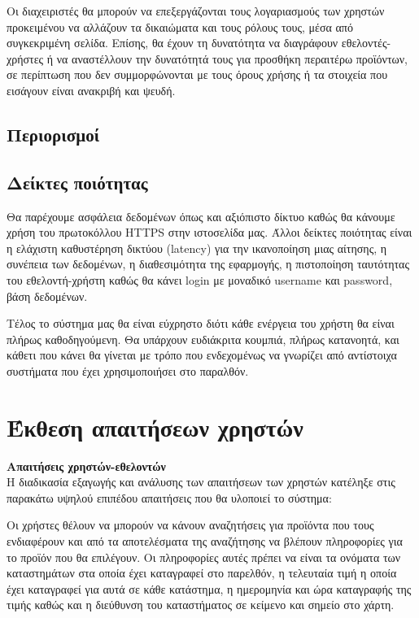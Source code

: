 \documentclass[12pt, oneside, a4paper]{report}
\begin{document}
\hspace{0.6cm}Οι διαχειριστές θα μπορούν να επεξεργάζονται τους λογαριασμούς των χρηστών προκειμένου να αλλάζουν τα δικαιώματα και τους ρόλους τους, μέσα από συγκεκριμένη σελίδα. Επίσης, θα έχουν τη δυνατότητα να διαγράφουν εθελοντές-χρήστες ή να αναστέλλουν την δυνατότητά τους για προσθήκη περαιτέρω προϊόντων, σε περίπτωση που δεν συμμορφώνονται με τους όρους χρήσης ή τα στοιχεία που εισάγουν είναι ανακριβή και ψευδή.

\subsection{Περιορισμοί}

\subsection{Δείκτες ποιότητας}
\hspace{0.6cm}Θα παρέχουμε ασφάλεια δεδομένων όπως και αξιόπιστο δίκτυο καθώς θα κάνουμε χρήση του πρωτοκόλλου HTTPS στην ιστοσελίδα μας. Άλλοι δείκτες ποιότητας είναι η ελάχιστη καθυστέρηση δικτύου (latency) για την ικανοποίηση μιας αίτησης, η συνέπεια των δεδομένων, η διαθεσιμότητα της εφαρμογής, η πιστοποίηση ταυτότητας του εθελοντή-χρήστη καθώς θα κάνει login με μοναδικό username και password, βάση δεδομένων.

\hspace{0.6cm}Τέλος το σύστημα μας θα είναι εύχρηστο διότι κάθε ενέργεια του χρήστη θα είναι πλήρως καθοδηγούμενη. Θα υπάρχουν ευδιάκριτα κουμπιά, πλήρως κατανοητά, και κάθετι που κάνει θα γίνεται με τρόπο που ενδεχομένως να γνωρίζει από αντίστοιχα συστήματα που έχει χρησιμοποιήσει στο παραλθόν.

\section{Έκθεση απαιτήσεων χρηστών}

\textbf{Απαιτήσεις χρηστών-εθελοντών}\\
\vspace{0.5cm}
\hspace{0.6cm}Η διαδικασία εξαγωγής και ανάλυσης των απαιτήσεων των χρηστών κατέληξε στις παρακάτω υψηλού επιπέδου απαιτήσεις που θα υλοποιεί το σύστημα:

\hspace{0.6cm}Οι χρήστες θέλουν να μπορούν να κάνουν αναζητήσεις για προϊόντα που τους ενδιαφέρουν και από τα αποτελέσματα της αναζήτησης να βλέπουν πληροφορίες για το προϊόν που θα επιλέγουν. Οι πληροφορίες αυτές πρέπει να είναι τα ονόματα των καταστημάτων στα οποία έχει καταγραφεί στο παρελθόν, η τελευταία τιμή η οποία έχει καταγραφεί για αυτά σε κάθε κατάστημα, η ημερομηνία και ώρα καταγραφής της τιμής καθώς και η διεύθυνση του καταστήματος σε κείμενο και σημείο στο χάρτη. 
\end{document}

